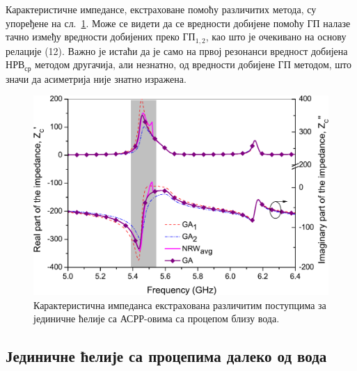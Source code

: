\documentclass[main.tex]{subfiles}
\begin{document}
Карактеристичне импедансе, екстраховане помоћу различитих метода, су упоређене на сл.~\ref{fig7}. Може се видети да се вредности добијене помоћу $ГП$ налазе тачно између вредности добијених преко $ГП_{1,2}$, као што је очекивано на основу релације (12). Важно је истаћи да је само на првој резонанси вредност добијена $НРВ_{ср}$ методом другачија, али незнатно, од вредности добијене $ГП$ методом, што значи да асиметрија није знатно изражена.
\begin{figure}[!t]
\centering
\includegraphics[scale=\SkalaB]{slike/11a.pdf}
\caption{Карактеристична импеданса екстрахована различитим поступцима за јединичне ћелије са АСРР-овима са процепом близу вода.}
\label{fig7}
\end{figure} 

\subsection{Јединичне ћелије са процепима далеко од вода}
\end{document}
